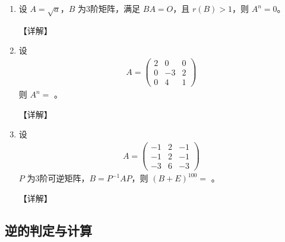 \documentclass[12pt, a4paper, oneside, UTF8]{ctexbook}
\begin{document}
\begin{enumerate}[label=\arabic*.]
    \item 设 $ A = \sqrt{a} $，$ B $ 为3阶矩阵，满足 $ BA = O $，且 $ r(B) > 1 $，则 $ A^n = 0 $。
    
    \begin{solution}
    【详解】
    \end{solution}
    
    \item 设 
    \begin{align*}
    A = \begin{pmatrix}
    2 & 0 & 0 \\
    0 & -3 & 2 \\
    0 & 4 & 1
    \end{pmatrix}
    \end{align*}
    则 $ A^n = $ \underline{\hspace{3cm}}。
    
    \begin{solution}
    【详解】
    \end{solution}
    
    \item 设 
    \begin{align*}
    A = \begin{pmatrix}
    -1 & 2 & -1 \\
    -1 & 2 & -1 \\
    -3 & 6 & -3
    \end{pmatrix}
    \end{align*}
    $ P $ 为3阶可逆矩阵，$ B = P^{-1}AP $，则 $ (B + E)^{100} = $ \underline{\hspace{3cm}}。
    
    \begin{solution}
    【详解】
    \end{solution}
\end{enumerate}

\subsection{逆的判定与计算}
\end{document}
